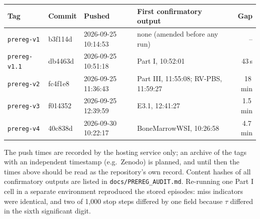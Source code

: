 \documentclass[11pt]{article}
\theoremstyle{remark}
\theoremstyle{definition}
\begin{document}
\begin{center}\small
\begin{tabular}{@{}llllr@{}}
\toprule
Tag & Commit & Pushed & First confirmatory output & Gap\\
\midrule
\texttt{prereg-v1} & b3f114d & 2026-09-25 10:14:53 & none (amended before any run) & --\\
\texttt{prereg-v1.1} & db4463d & 2026-09-25 10:51:18 & Part I, 10:52:01 & 43\,s\\
\texttt{prereg-v2} & fc4f1e8 & 2026-09-25 11:36:43 & Part III, 11:55:08; RV-PBS, 11:59:27 & 18\,min\\
\texttt{prereg-v3} & f014352 & 2026-09-25 12:39:59 & E3.1, 12:41:27 & 1.5\,min\\
\texttt{prereg-v4} & 40c838d & 2026-09-30 10:22:17 & BoneMarrowWSI, 10:26:58 & 4.7\,min\\
\bottomrule
\end{tabular}
\end{center}
The push times are recorded by the hosting service only; an archive of the tags with an independent timestamp (e.g.\ Zenodo) is planned, and until then the times above should be read as the repository's own record. Content hashes of all confirmatory outputs are listed in \texttt{docs/PREREG\_AUDIT.md}. Re-running one Part I cell in a separate environment reproduced the stored episodes: miss indicators were identical, and two of 1,000 stop steps differed by one field because $\tau$ differed in the sixth significant digit.
\end{document}
